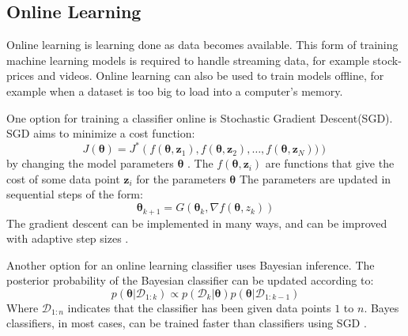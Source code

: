 \subsection{Online Learning}
  Online learning is learning done as data becomes available.
  This form of training machine learning models is required to handle streaming data, for example stock-prices and videos.
  Online learning can also be used to train models offline, for example when a dataset is too big to load into a computer's memory.

  One option for training a classifier online is Stochastic Gradient Descent(SGD).
  SGD aims to minimize a cost function: 
  \begin{equation*}
    J(\pmb{\theta}) = J^*\left(f(\pmb{\theta}, \pmb{z}_1), f(\pmb{\theta}, \pmb{z}_2),\hdots, f(\pmb{\theta}, \mathbf{z}_N))\right)
  \end{equation*}
  by changing the model parameters $\pmb{\theta}$ \cite{murphy2012}.
  The $f(\pmb{\theta}, \pmb{z}_i)$ are functions that give the cost of some data point $\pmb{z}_i$ for the parameters $\pmb{\theta}$
  The parameters are updated in sequential steps of the form:
  \begin{equation*}
    \pmb{\theta}_{k + 1} = G(\pmb{\theta}_k, \nabla f(\pmb{\theta}, z_k))
  \end{equation*}
  The gradient descent can be implemented in many ways, and can be improved with adaptive step sizes \cite{duchi2011}.

  Another option for an online learning classifier uses Bayesian inference.
  The posterior probability of the Bayesian classifier can be updated according to:
  \begin{equation*}
    p(\pmb{\theta} | \mathcal{D}_{1:k}) \propto p(\mathcal{D}_k | \pmb{\theta})p(\pmb{\theta} | \mathcal{D}_{1:k-1})
  \end{equation*}
  Where $\mathcal{D}_{1:n}$ indicates that the classifier has been given data points $1$ to $n$.
  Bayes classifiers, in most cases, can be trained faster than classifiers using SGD \cite{murphy2012}.
